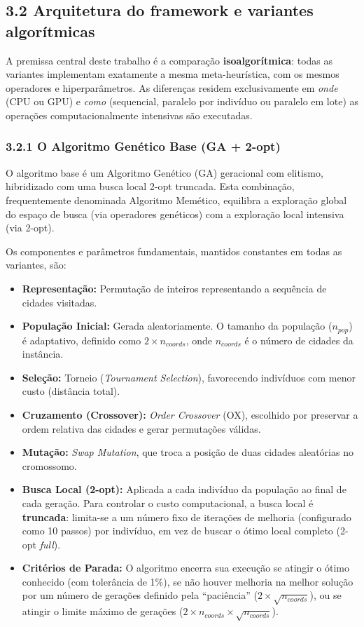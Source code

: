 \subsection{3.2 Arquitetura do framework e variantes
algorítmicas}\label{sec-32-arquitetura-variantes}

A premissa central deste trabalho é a comparação
\textbf{isoalgorítmica}: todas as variantes implementam exatamente a
mesma meta-heurística, com os mesmos operadores e hiperparâmetros. As
diferenças residem exclusivamente em \emph{onde} (CPU ou GPU) e
\emph{como} (sequencial, paralelo por indivíduo ou paralelo em lote) as
operações computacionalmente intensivas são executadas.

\subsubsection{3.2.1 O Algoritmo Genético Base (GA +
2-opt)}\label{sec-321-ga-base}

O algoritmo base é um Algoritmo Genético (GA) geracional com elitismo,
hibridizado com uma busca local 2-opt truncada. Esta combinação,
frequentemente denominada Algoritmo Memético, equilibra a exploração
global do espaço de busca (via operadores genéticos) com a exploração
local intensiva (via 2-opt).

Os componentes e parâmetros fundamentais, mantidos constantes em todas
as variantes, são:

\begin{itemize}
\tightlist
\item
  \textbf{Representação:} Permutação de inteiros representando a
  sequência de cidades visitadas.
\item
  \textbf{População Inicial:} Gerada aleatoriamente. O tamanho da
  população (\(n_{pop}\)) é adaptativo, definido como
  \(2 \times n_{coords}\), onde \(n_{coords}\) é o número de cidades da
  instância.
\item
  \textbf{Seleção:} Torneio (\emph{Tournament Selection}), favorecendo
  indivíduos com menor custo (distância total).
\item
  \textbf{Cruzamento (Crossover):} \emph{Order Crossover} (OX),
  escolhido por preservar a ordem relativa das cidades e gerar
  permutações válidas.
\item
  \textbf{Mutação:} \emph{Swap Mutation}, que troca a posição de duas
  cidades aleatórias no cromossomo.
\item
  \textbf{Busca Local (2-opt):} Aplicada a cada indivíduo da população
  ao final de cada geração. Para controlar o custo computacional, a
  busca local é \textbf{truncada}: limita-se a um número fixo de
  iterações de melhoria (configurado como 10 passos) por indivíduo, em
  vez de buscar o ótimo local completo (2-opt \emph{full}).
\item
  \textbf{Critérios de Parada:} O algoritmo encerra sua execução se
  atingir o ótimo conhecido (com tolerância de 1\%), se não houver
  melhoria na melhor solução por um número de gerações definido pela
  ``paciência'' (\(2 \times \sqrt{n_{coords}}\)), ou se atingir o limite
  máximo de gerações (\(2 \times n_{coords} \times \sqrt{n_{coords}}\)).
\end{itemize}

